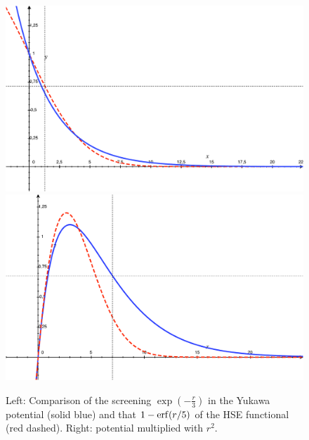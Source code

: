 \documentclass[11pt,a4paper]{report}
\begin{document}
\begin{figure}[h!]
\begin{center}
\includegraphics[width=0.45\linewidth]{Figs/YukawavsHSE/hsevsyukawa}
\includegraphics[width=0.45\linewidth]{Figs/YukawavsHSE/hsevsyukawapotx2}
\end{center}
\caption{\label{hsevsyukawa}Left: Comparison of the screening
  $\exp(-\frac{r}{3})$ in the Yukawa potential (solid blue) and that
  $1-{\rm erf}(r/5)$ of the HSE functional (red dashed). Right: potential
  multiplied with $r^2$.}
\end{figure}









\end{document}

